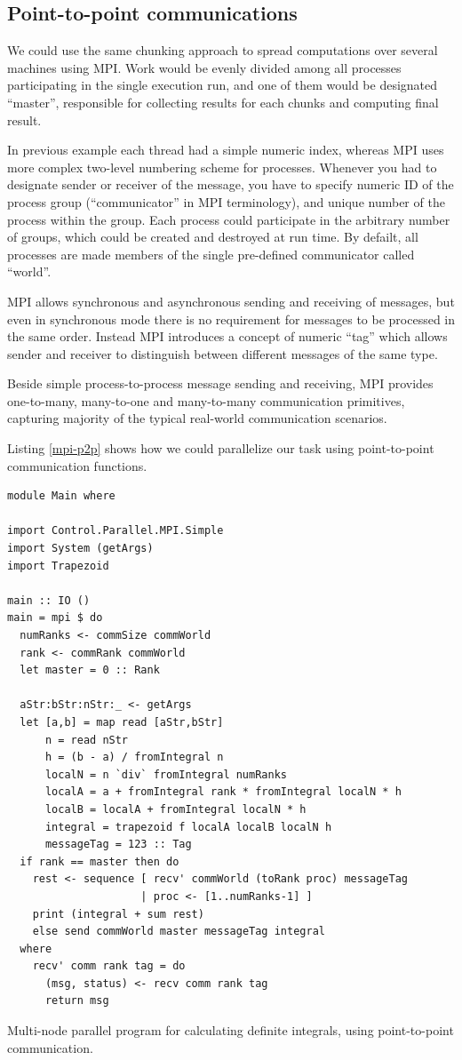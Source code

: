 \documentclass{tmr}
\begin{document}
\subsection{Point-to-point communications}

We could use the same chunking approach to spread computations over
several machines using MPI. Work would be evenly divided among all
processes participating in the single execution run, and one of them
would be designated ``master'', responsible for collecting results for
each chunks and computing final result. 

In previous example each thread had a simple numeric index, whereas
MPI uses more complex two-level numbering scheme for processes.
Whenever you had to designate sender or receiver of the message, you
have to specify numeric ID of the process group (``communicator'' in
MPI terminology), and unique number of the process within the group.
Each process could participate in the arbitrary number of groups,
which could be created and destroyed at run time. By defailt, all
processes are made members of the single pre-defined communicator
called ``world''.

MPI allows synchronous and asynchronous sending and receiving of
messages, but even in synchronous mode there is no requirement for
messages to be processed in the same order. Instead MPI introduces a
concept of numeric ``tag'' which allows sender and receiver to
distinguish between different messages of the same type.

Beside simple process-to-process message sending and receiving, MPI
provides one-to-many, many-to-one and many-to-many communication
primitives, capturing majority of the typical real-world communication
scenarios.

Listing \ref{mpi-p2p} shows how we could parallelize our task using
point-to-point communication functions.

\begin{listing}
\begin{Verbatim}
module Main where

import Control.Parallel.MPI.Simple
import System (getArgs)
import Trapezoid

main :: IO ()
main = mpi $ do
  numRanks <- commSize commWorld
  rank <- commRank commWorld
  let master = 0 :: Rank
      
  aStr:bStr:nStr:_ <- getArgs
  let [a,b] = map read [aStr,bStr]
      n = read nStr
      h = (b - a) / fromIntegral n
      localN = n `div` fromIntegral numRanks
      localA = a + fromIntegral rank * fromIntegral localN * h
      localB = localA + fromIntegral localN * h
      integral = trapezoid f localA localB localN h
      messageTag = 123 :: Tag
  if rank == master then do 
    rest <- sequence [ recv' commWorld (toRank proc) messageTag 
                     | proc <- [1..numRanks-1] ]
    print (integral + sum rest)
    else send commWorld master messageTag integral
  where
    recv' comm rank tag = do 
      (msg, status) <- recv comm rank tag
      return msg
\end{Verbatim}
\caption{Multi-node parallel program for calculating definite
  integrals, using point-to-point communication. \label{mpi-p2p}}
\end{listing}
\end{document}
